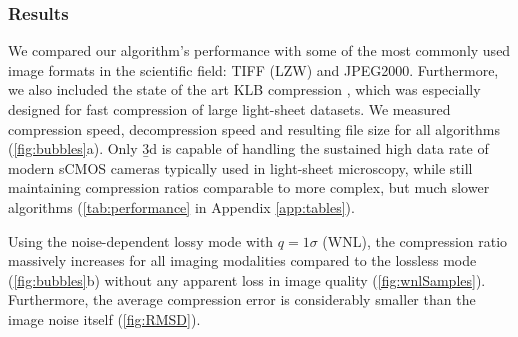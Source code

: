 \subsubsection{Results}
  We compared our algorithm’s performance with some of the most commonly used image formats in the scientific field: TIFF (LZW) and JPEG2000. Furthermore, we also included the state of the art KLB compression \cite{amat_efficient_2015}, which was especially designed for fast compression of large light-sheet datasets. We measured compression speed, decompression speed and resulting file size for all algorithms (\autoref{fig:bubbles}a). Only \b3d is capable of handling the sustained high data rate of modern sCMOS cameras typically used in light-sheet microscopy, while still maintaining compression ratios comparable to more complex, but much slower algorithms (\autoref{tab:performance} in Appendix \ref{app:tables}).

  Using the noise-dependent lossy mode with $q=1\sigma$ (WNL), the compression ratio massively increases for all imaging modalities compared to the lossless mode (\autoref{fig:bubbles}b) without any apparent loss in image quality (\autoref{fig:wnlSamples}). Furthermore, the average compression error is considerably smaller than the image noise itself (\autoref{fig:RMSD}).

